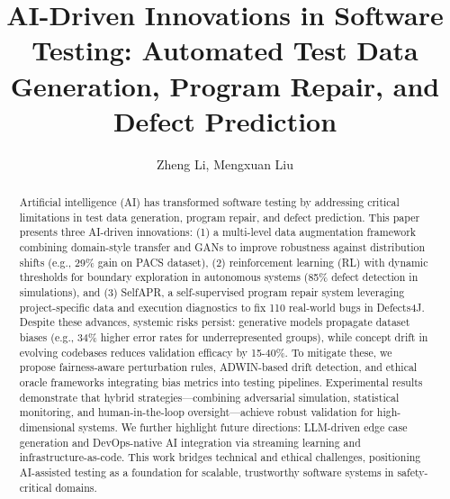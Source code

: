 \documentclass[manuscript,screen,review]{acmart}
\begin{document}
\title{AI-Driven Innovations in Software Testing: Automated Test Data Generation, Program Repair, and Defect Prediction}

\author{Zheng Li, Mengxuan Liu}

\renewcommand{\shortauthors}{Li et al.}

\begin{abstract}
Artificial intelligence (AI) has transformed software testing by addressing critical limitations in test data generation, program repair, and defect prediction. This paper presents three AI-driven innovations: (1) a multi-level data augmentation framework combining domain-style transfer and GANs to improve robustness against distribution shifts (e.g., 29\% gain on PACS dataset), (2) reinforcement learning (RL) with dynamic thresholds for boundary exploration in autonomous systems (85\% defect detection in simulations), and (3) SelfAPR, a self-supervised program repair system leveraging project-specific data and execution diagnostics to fix 110 real-world bugs in Defects4J. Despite these advances, systemic risks persist: generative models propagate dataset biases (e.g., 34\% higher error rates for underrepresented groups), while concept drift in evolving codebases reduces validation efficacy by 15-40\%. To mitigate these, we propose fairness-aware perturbation rules, ADWIN-based drift detection, and ethical oracle frameworks integrating bias metrics into testing pipelines. Experimental results demonstrate that hybrid strategies---combining adversarial simulation, statistical monitoring, and human-in-the-loop oversight---achieve robust validation for high-dimensional systems. We further highlight future directions: LLM-driven edge case generation and DevOps-native AI integration via streaming learning and infrastructure-as-code. This work bridges technical and ethical challenges, positioning AI-assisted testing as a foundation for scalable, trustworthy software systems in safety-critical domains.
\end{abstract}
\end{document}
